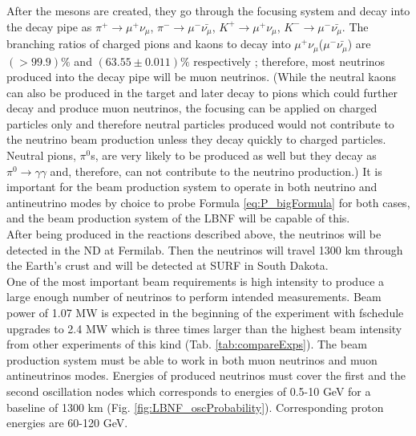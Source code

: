 After the mesons are created, they go through the focusing system and decay into the decay pipe as $\pi^+ \rightarrow \mu^+\nu_\mu$, $\pi^- \rightarrow \mu^-\bar{\nu_\mu}$, $K^+ \rightarrow \mu^+\nu_\mu$, $K^- \rightarrow \mu^-\bar{\nu_\mu}$. The branching ratios of charged pions and kaons to decay into $\mu^+\nu_\mu$($\mu^-\bar{\nu_\mu}$) are $(>99.9)\%$ and $(63.55\pm0.011)\%$ respectively \cite{ref_PDG}; therefore, most neutrinos produced into the decay pipe will be muon neutrinos. (While the neutral kaons can also be produced in the target and later decay to pions which could further decay and produce muon neutrinos, the focusing can be applied on charged particles only and therefore neutral particles produced would not contribute to the neutrino beam production unless they decay quickly to charged particles. Neutral pions, $\pi^0$s, are very likely to be produced as well but they decay as $\pi^0 \rightarrow \gamma\gamma$ and, therefore, can not contribute to the neutrino production.) It is important for the beam production system to operate in both neutrino and antineutrino modes by choice to probe Formula \ref{eq:P_bigFormula} for both cases, and the beam production system of the LBNF will be capable of this.\\
After being produced in the reactions described above, the neutrinos will be detected in the ND at Fermilab. Then the neutrinos will travel 1300 km through the Earth's crust and will be detected at SURF in South Dakota.\\  

One of the most important beam requirements is high intensity to produce a large enough number of neutrinos to perform intended measurements. Beam power of 1.07 MW is expected in the beginning of the experiment with fschedule upgrades to 2.4 MW which is three times larger than the highest beam intensity from other experiments of this kind (Tab. \ref{tab:compareExps}). The beam production system must be able to work in both muon neutrinos and muon antineutrinos modes. Energies of produced neutrinos must cover the first and the second oscillation nodes which corresponds to energies of 0.5-10 GeV for a baseline of 1300 km (Fig. \ref{fig:LBNF_oscProbability}). Corresponding proton energies are 60-120 GeV.

